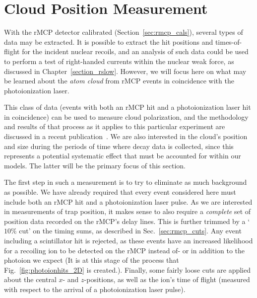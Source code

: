 \section{Cloud Position Measurement}
\label{sec:cloud_calibration}
With the \ac{rMCP} detector calibrated (Section~\ref{sec:rmcp_cals}), several types of data may be extracted.  It is possible to extract the hit positions and times-of-flight for the incident nuclear recoils, and an analysis of such data could be used to perform a test of right-handed currents within the nuclear weak force, as discussed in Chapter~\ref{section_rslow}.  However, we will focus here on what may be learned about the \emph{atom cloud} from rMCP events in coincidence with the photoionization laser.~  

This class of data (events with both an \ac{rMCP} hit and a photoionization laser hit in coincidence) can be used to measure cloud polarization, and the methodology and results of that process as it applies to this particular experiment are discussed in a recent publication~\cite{ben_OP}.  We are also interested in the cloud's position and size during the periods of time where decay data is collected, since this represents a potential systematic effect that must be accounted for within our models.  The latter will be the primary focus of this section.  

The first step in such a measurement is to try to eliminate as much background as possible.  We have already required that every event considered here must include both an rMCP hit and a photoionization laser pulse.  As we are interested in measurements of trap position, it makes sense to also require a \emph{complete} set of position data recorded on the \ac{rMCP}'s delay lines.   This is further trimmed by a `$10\%$ cut' on the timing sums, as described in Sec.~\ref{sec:rmcp_cuts}.  Any event including a scintillator hit is rejected, as these events have an increased likelihood for a recoiling ion to be detected on the rMCP instead of- or in addition to the photoion we expect (It is at this stage of the process that Fig.~\ref{fig:photoionhits_2D} is created.).  Finally, some fairly loose cuts are applied about the central $x$- and $z$-positions, as well as the ion's time of flight (measured with respect to the arrival of a photoionization laser pulse).

